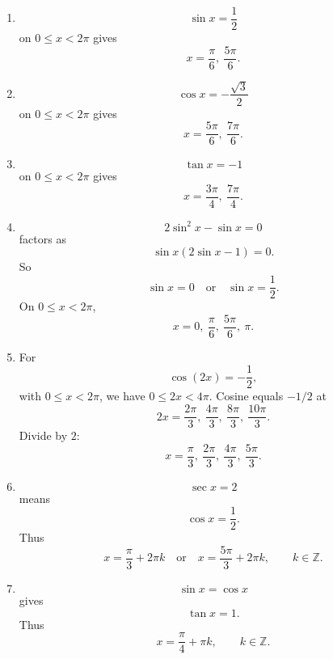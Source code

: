 \begin{enumerate}
\item
\[
\sin x=\frac12
\]
on \(0\le x<2\pi\) gives
\[
\boxed{
x=\frac{\pi}{6},\ \frac{5\pi}{6}.
}
\]

\item
\[
\cos x=-\frac{\sqrt3}{2}
\]
on \(0\le x<2\pi\) gives
\[
\boxed{
x=\frac{5\pi}{6},\ \frac{7\pi}{6}.
}
\]

\item
\[
\tan x=-1
\]
on \(0\le x<2\pi\) gives
\[
\boxed{
x=\frac{3\pi}{4},\ \frac{7\pi}{4}.
}
\]

\item
\[
2\sin^2 x-\sin x=0
\]
factors as
\[
\sin x(2\sin x-1)=0.
\]
So
\[
\sin x=0
\quad\text{or}\quad
\sin x=\frac12.
\]
On \(0\le x<2\pi\),
\[
\boxed{
x=0,\ \frac{\pi}{6},\ \frac{5\pi}{6},\ \pi.
}
\]

\item
For
\[
\cos(2x)=-\frac12,
\]
with \(0\le x<2\pi\), we have \(0\le2x<4\pi\).  Cosine equals \(-1/2\) at
\[
2x=\frac{2\pi}{3},\ \frac{4\pi}{3},\ \frac{8\pi}{3},\ \frac{10\pi}{3}.
\]
Divide by \(2\):
\[
\boxed{
x=\frac{\pi}{3},\ \frac{2\pi}{3},\ \frac{4\pi}{3},\ \frac{5\pi}{3}.
}
\]

\item
\[
\sec x=2
\]
means
\[
\cos x=\frac12.
\]
Thus
\[
\boxed{
x=\frac{\pi}{3}+2\pi k
\quad\text{or}\quad
x=\frac{5\pi}{3}+2\pi k,
\qquad k\in\mathbb Z.
}
\]

\item
\[
\sin x=\cos x
\]
gives
\[
\tan x=1.
\]
Thus
\[
\boxed{
x=\frac{\pi}{4}+\pi k,
\qquad k\in\mathbb Z.
}
\]
\end{enumerate}